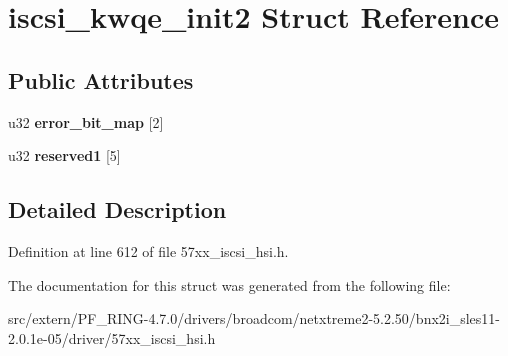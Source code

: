 \hypertarget{structiscsi__kwqe__init2}{
\section{iscsi\_\-kwqe\_\-init2 Struct Reference}
\label{structiscsi__kwqe__init2}
}
\subsection*{Public Attributes}
\begin{DoxyCompactItemize}
\item 
\hypertarget{structiscsi__kwqe__init2_a40d86fec5e223b1e37ceaa1b92bfac0d}{
u32 {\bfseries error\_\-bit\_\-map} \mbox{[}2\mbox{]}}
\label{structiscsi__kwqe__init2_a40d86fec5e223b1e37ceaa1b92bfac0d}

\item 
\hypertarget{structiscsi__kwqe__init2_a3be8832106d36e6f5cba27afcdf8e021}{
u32 {\bfseries reserved1} \mbox{[}5\mbox{]}}
\label{structiscsi__kwqe__init2_a3be8832106d36e6f5cba27afcdf8e021}

\end{DoxyCompactItemize}


\subsection{Detailed Description}


Definition at line 612 of file 57xx\_\-iscsi\_\-hsi.h.



The documentation for this struct was generated from the following file:\begin{DoxyCompactItemize}
\item 
src/extern/PF\_\-RING-\/4.7.0/drivers/broadcom/netxtreme2-\/5.2.50/bnx2i\_\-sles11-\/2.0.1e-\/05/driver/57xx\_\-iscsi\_\-hsi.h\end{DoxyCompactItemize}
